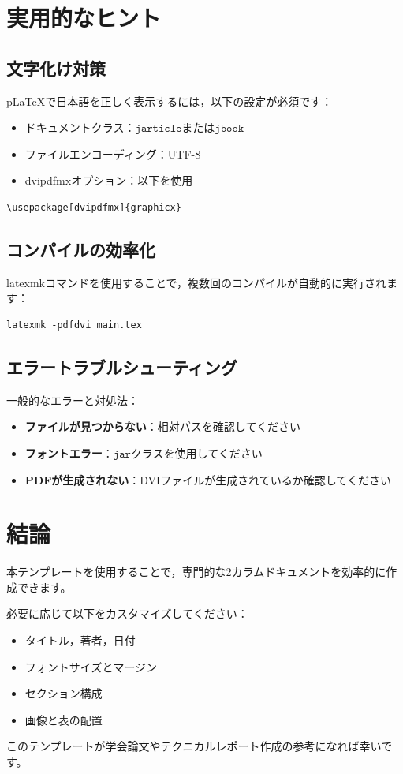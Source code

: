 \documentclass[11pt,a4paper,dvipdfmx,twocolumn]{jarticle}
\begin{document}
\section{実用的なヒント}

\subsection{文字化け対策}

pLaTeXで日本語を正しく表示するには，以下の設定が必須です：

\begin{itemize}
    \item ドキュメントクラス：\(\texttt{jarticle}\)または\(\texttt{jbook}\)
    \item ファイルエンコーディング：UTF-8
    \item dvipdfmxオプション：以下を使用
\end{itemize}

\begin{verbatim}
\usepackage[dvipdfmx]{graphicx}
\end{verbatim}

\subsection{コンパイルの効率化}

latexmkコマンドを使用することで，複数回のコンパイルが自動的に実行されます：

\begin{verbatim}
latexmk -pdfdvi main.tex
\end{verbatim}

\subsection{エラートラブルシューティング}

一般的なエラーと対処法：

\begin{itemize}
    \item \textbf{ファイルが見つからない}：相対パスを確認してください
    \item \textbf{フォントエラー}：\(\texttt{jar}\)クラスを使用してください
    \item \textbf{PDFが生成されない}：DVIファイルが生成されているか確認してください
\end{itemize}

\section{結論}

本テンプレートを使用することで，専門的な2カラムドキュメントを効率的に作成できます。

必要に応じて以下をカスタマイズしてください：

\begin{itemize}
    \item タイトル，著者，日付
    \item フォントサイズとマージン
    \item セクション構成
    \item 画像と表の配置
\end{itemize}

このテンプレートが学会論文やテクニカルレポート作成の参考になれば幸いです。
\end{document}
